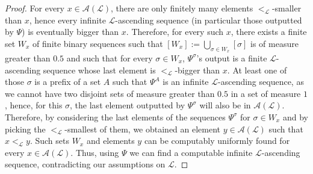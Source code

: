 \documentclass{article}
\numberwithin{theorem}{section}
\newtheorem{proposition}[theorem]{Proposition}
\def\D{\mathcal{D}}
\def\L{\mathcal{L}}
\def\A{\mathcal{A}}
\newcommand{\cs}{2^{\NN}}
\newcommand{\bstr}{2^{<\NN}}
\newcommand{\NN}[0]{\mathbb{N}}
\begin{document}
\begin{proof}
For every $x \in \A(\L)$, there are only finitely many elements $<_{\L}$-smaller than $x$, hence every infinite $\L$-ascending sequence (in particular those outputted by $\Psi$) is eventually bigger than $x$. Therefore, for every such $x$, there exists a finite set $W_x$ of finite binary sequences such that $[W_x] := \bigcup_{\sigma \in W_x} [\sigma]$ is of measure greater than $0.5$ and such that for every $\sigma \in W_x$, $\Psi^{\sigma}$'s output is a finite $\L$-ascending sequence whose last element is $<_{\L}$-bigger than $x$. At least one of those $\sigma$ is a prefix of a set $A$ such that $\Psi^A$ is an infinite $\L$-ascending sequence, as we cannot have two disjoint sets of measure greater than $0.5$ in a set of measure $1$, hence, for this $\sigma$, the last element outputted by $\Psi^{\sigma}$ will also be in $\A(\L)$. Therefore, by considering the last elements of the sequences $\Psi^{\sigma}$ for $\sigma \in W_x$ and by picking the $<_{\L}$-smallest of them, we obtained an element $y \in \A(\L)$ such that $x <_{\L} y$. Such sets $W_x$ and elements $y$ can be computably uniformly found for every $x \in \A(\L)$. Thus, using $\Psi$ we can find a computable infinite $\L$-ascending sequence, contradicting our assumptions on $\L$.
\end{proof}


\end{document}

